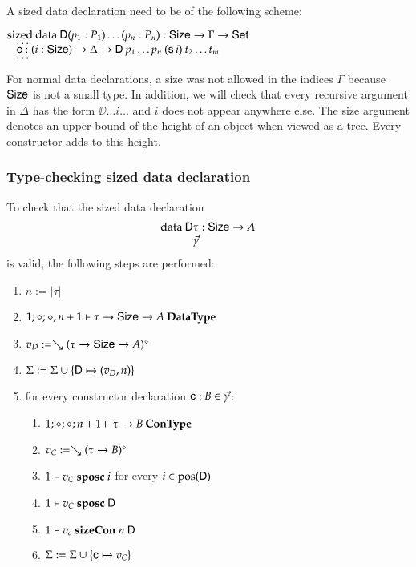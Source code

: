 \noindent A sized data declaration need to be of the following scheme:
\begin{bsp}
$\mathrm{sized}\: \mathrm{data}\: \mathsf{D} ( p_1 : P_1) \ldots ( p_n : P_n) : \mathsf{Size} \rightarrow \Gamma \rightarrow \mathsf{Set} $\\
$\hspace*{3mm} \ldots$\\
$\hspace*{3mm} \mathsf{c} : (i : \mathsf{Size}) \rightarrow \Delta \rightarrow \mathsf{D} \: p_1 \ldots p_n \: (\mathsf{s}\, i) \: t_2 \ldots t_m$\\
$\hspace*{3mm} \ldots$\\   
\end{bsp}
For normal data declarations, a size was not allowed in the indices $\Gamma$ because $\mathsf{Size}$ is not a small type.
In addition, we will check that every recursive argument in $\Delta$ has the form $\DD \ldots i \ldots $ and $i$ does not appear anywhere else. The size argument denotes an upper bound of the height of an object when viewed as a tree. Every constructor adds to this height.

\subsubsection{Type-checking sized data declaration}

To check that the sized data declaration
\[\begin{array}{l}
\data \DD \tau : \Size \ra A \\
\spcx \vec{\gamma}
\end{array}
\]
is valid, the following steps are performed: 
\begin{enumerate}
\item
$ n := \vert\tau\vert$
\item
$1;\diamond;\diamond;n+1\vdash\tau \rightarrow \mathsf{Size} \rightarrow A\:\mathbf{Data Type}$
\item
$v_D := \searrow (\tau \rightarrow \mathsf{Size} \rightarrow A)^{\diamond}$
\item
$\Sigma := \Sigma \cup \{\mathsf{D} \mapsto (v_D,n)\}$
\item
for every constructor declaration $\mathsf{c} : B  \in \vec{\gamma}$:
\begin{enumerate} 
\item
$1;\diamond;\diamond;n+1\vdash\tau \rightarrow B\:\mathbf{Con Type}$
\item
$v_C := \searrow (\tau \rightarrow B)^{\diamond}$
\item
$1\vdash v_C\mbox{ \textbf{sposc} }i$ for every $i \in \mbox{pos}(\mathsf{D}) $ 
\item
$1\vdash v_C\mbox{ \textbf{sposc} }\mathsf{D}$
\item
$1\vdash v_c\mbox{ \textbf{sizeCon} }n\:\mathsf{D}$
\item
$\Sigma := \Sigma \cup \{\mathsf{c} \mapsto v_C\}$
\end{enumerate}
\end{enumerate}

